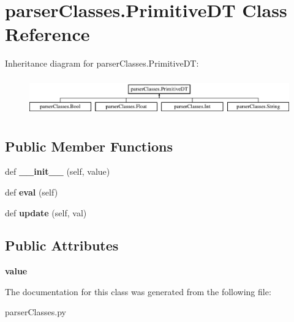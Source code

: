 \hypertarget{classparser_classes_1_1_primitive_d_t}{}\section{parser\+Classes.\+Primitive\+DT Class Reference}
\label{classparser_classes_1_1_primitive_d_t}
Inheritance diagram for parser\+Classes.\+Primitive\+DT\+:\begin{figure}[H]
\begin{center}
\leavevmode
\includegraphics[height=1.656805cm]{classparser_classes_1_1_primitive_d_t}
\end{center}
\end{figure}
\subsection*{Public Member Functions}
\begin{DoxyCompactItemize}
\item 
\mbox{\label{classparser_classes_1_1_primitive_d_t_afc7a88a3500def7e2831c94385b822e3}} 
def {\bfseries \+\_\+\+\_\+init\+\_\+\+\_\+} (self, value)
\item 
\mbox{\label{classparser_classes_1_1_primitive_d_t_a4b0a4891bc06d83090e2dde406114214}} 
def {\bfseries eval} (self)
\item 
\mbox{\label{classparser_classes_1_1_primitive_d_t_ad52adc67041de2a7abfe4c25c0b0558d}} 
def {\bfseries update} (self, val)
\end{DoxyCompactItemize}
\subsection*{Public Attributes}
\begin{DoxyCompactItemize}
\item 
\mbox{\label{classparser_classes_1_1_primitive_d_t_a2f2bc9ba2df4e0db223f44eef3f2c162}} 
{\bfseries value}
\end{DoxyCompactItemize}


The documentation for this class was generated from the following file\+:\begin{DoxyCompactItemize}
\item 
parser\+Classes.\+py\end{DoxyCompactItemize}
